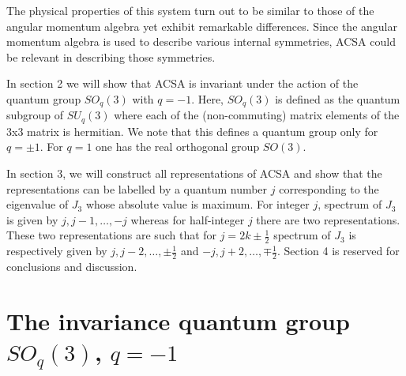 The physical properties of this system turn out to be similar to
those of the angular momentum algebra yet exhibit remarkable
differences. Since the angular momentum algebra is used to
describe various internal symmetries, ACSA could be relevant in
describing those symmetries.

In section 2 we will show that ACSA is invariant under the action
of the quantum group $SO_q(3)$ with $q=-1$. Here, $SO_q(3)$ is
defined as the quantum subgroup of $SU_q(3)$ where each of the
(non-commuting) matrix elements of the $3$x$3$ matrix is
hermitian. We note that this defines a quantum group only for
$q=\pm1$. For $q=1$ one has the real orthogonal group $SO(3)$.

In section 3, we will construct all representations of ACSA and
show that the representations can be labelled by a quantum number
$j$ corresponding to the eigenvalue of $J_3$ whose absolute value
is maximum. For integer $j$, spectrum of $J_3$ is given by $j,
j-1, \ldots, -j$ whereas for half-integer $j$ there are two
representations. These two representations are such that for $j =
2k\pm\frac12$ spectrum of $J_3$ is respectively given by $j, j-2,
\ldots, \pm\frac12$ and $-j, j+2, \ldots, \mp\frac12$. Section 4
is reserved for conclusions and discussion.

\section{The invariance quantum group $SO_q(3)$, $q= -1$}

